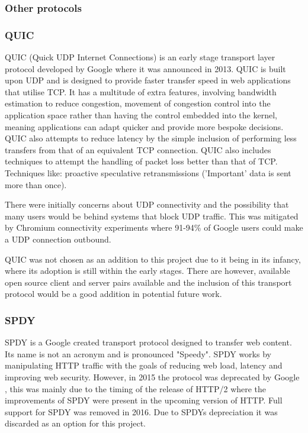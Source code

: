 \subsubsection{Other protocols}
\label{ref:otherProtocols}
\subsubsection*{QUIC}
QUIC (Quick UDP Internet Connections) \citep{hamilton2016quic} is an early stage transport layer protocol developed by Google where it was announced in 2013. QUIC is built upon UDP and is designed to provide faster transfer speed in web applications that utilise TCP.
It has a multitude of extra features, involving bandwidth estimation to reduce congestion, movement of congestion control into the application space rather than having the control embedded into the kernel, meaning applications can adapt quicker and provide more bespoke decisions. QUIC also attempts to reduce latency by the simple inclusion of performing less transfers from that of an equivalent TCP connection. QUIC also includes techniques to attempt the handling of packet loss better than that of TCP. Techniques like: proactive speculative retransmissions ('Important' data is sent more than once).

There were initially concerns about UDP connectivity and the possibility that many users would be behind systems that block UDP traffic. This was mitigated by Chromium connectivity experiments \citep{roskind2013quic} where 91-94\% of Google users could make a UDP connection outbound.

QUIC was not chosen as an addition to this project due to it being in its infancy, where its adoption is still within the early stages. There are however, available open source client and server pairs available and the inclusion of this transport protocol would be a good addition in potential future work.

\subsubsection*{SPDY}
SPDY \citep{belshe2012spdy} is a Google created transport protocol designed to transfer web content. Its name is not an acronym and is pronounced "Speedy". SPDY works by manipulating HTTP traffic with the goals of reducing web load, latency and improving web security. However, in 2015 the protocol was deprecated by Google \citep{blog2015hello}, this was mainly due to the timing of the release of HTTP/2 where the improvements of SPDY were present in the upcoming version of HTTP. Full support for SPDY was removed in 2016. Due to SPDYs depreciation it was discarded as an option for this project.

